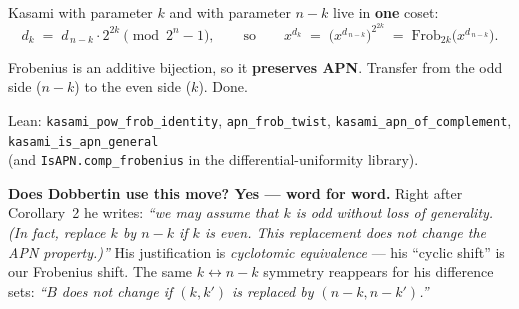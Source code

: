 \documentclass[11pt]{article}
\begin{document}
Kasami with parameter $k$ and with parameter $n-k$ live in \textbf{one}
coset:
\[
  d_k \;=\; d_{\,n-k}\cdot 2^{2k} \pmod{2^{n}-1},
  \qquad\text{so}\qquad
  x^{d_k} \;=\; \big(x^{d_{\,n-k}}\big)^{2^{2k}}
  \;=\; \mathrm{Frob}_{2k}\!\big(x^{d_{\,n-k}}\big).
\]

\begin{center}
\end{center}

Frobenius is an additive bijection, so it \textbf{preserves APN}. Transfer
from the odd side ($n-k$) to the even side ($k$). Done.

\begin{center}\small
Lean: \texttt{kasami\_pow\_frob\_identity}, \texttt{apn\_frob\_twist},
\texttt{kasami\_apn\_of\_complement}, \texttt{kasami\_is\_apn\_general}\\
(and \texttt{IsAPN.comp\_frobenius} in the differential-uniformity library).
\end{center}

\begin{note}
\textbf{Does Dobbertin use this move? Yes --- word for word.} Right after
Corollary~2 he writes: \emph{``we may assume that $k$ is odd without loss of
generality. (In fact, replace $k$ by $n-k$ if $k$ is even. This replacement
does not change the APN property.)''} His justification is
\emph{cyclotomic equivalence} --- his ``cyclic shift'' is our Frobenius shift.
The same $k\leftrightarrow n-k$ symmetry reappears for his difference sets:
\emph{``$B$ does not change if $(k,k')$ is replaced by $(n-k,n-k')$.''}
\end{note}
\end{document}
